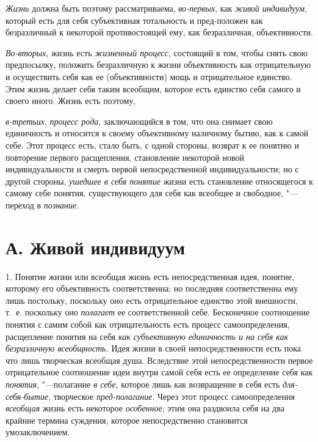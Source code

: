 {{{\em Жизнь} должна быть
поэтому рассматриваема,
{\em во-первых}, как
{\em живой индивидуум},
который есть для себя субъективная тотальность и пред-положен
как безразличный к некоторой противостоящей ему, как безразличная,
объективности.

{\em Во-вторых}, жизнь есть
{\em жизненный процесс},
состоящий в том, чтобы снять свою предпосылку, положить
безразличную к жизни объективность как отрицательную и осуществить себя как
ее (объективности) мощь и отрицательное единство. Этим жизнь делает себя
таким всеобщим, которое есть единство себя самого и своего иного. Жизнь
есть поэтому,

{\em в-третьих},
{\em процесс рода},
заключающийся в том, что она снимает свою единичность и
относится к своему объективному наличному бытию, как к самой себе. Этот
процесс есть, стало быть, с одной стороны, возврат к ее понятию и
повторение первого расщепления, становление некоторой новой
индивидуальности и смерть первой непосредственной индивидуальности; но с
другой стороны, {\em ушедшее в себя
понятие} жизни есть становление относящегося к самому себе
понятия, существующего для себя как всеобщее и свободное, "---
переход в
{\em познание}.

\section[А. Живой индивидуум]{А. Живой индивидуум}
1. Понятие жизни или всеобщая жизнь есть непосредственная
идея, понятие, которому его объективность соответственна; но последняя
соответственна ему лишь постольку, поскольку оно есть отрицательное
единство этой внешности, т.~е. поскольку оно
{\em полагает} ее
соответственной себе. Бесконечное соотношение понятия с самим собой как
отрицательность есть процесс самоопределения, расщепление понятия на себя
{\em как субъективную единичность и на
себя как безразличную всеобщность.} Идея жизни в своей
непосредственности есть пока что лишь творческая всеобщая душа. Вследствие
этой непосредственности первое отрицательное соотношение идеи внутри самой
себя есть ее определение себя как
{\em понятия}, "---полагание
{\em в себе}, которое
лишь как возвращение в себя есть
{\em для-себя-бытие},
творческое
{\em пред-полагание}.
Через этот процесс самоопределения
{\em всеобщая} жизнь есть
некоторое {\em особенное};
этим она раздвоила себя на два крайние термина суждения,
которое непосредственно становится умозаключением.

}}

